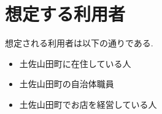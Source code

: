 \section{想定する利用者}
想定される利用者は以下の通りである.
\begin{itemize}[itemsep=10pt]
    \item 土佐山田町に在住している人
    \item 土佐山田町の自治体職員
    \item 土佐山田町でお店を経営している人
\end{itemize}
